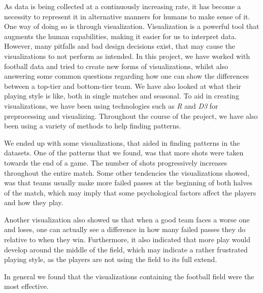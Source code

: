 \documentclass[Report.tex]{subfiles}
\begin{document}
 
As data is being collected at a continuously increasing rate, it has become a necessity to represent it in alternative manners for humans to make sense of it. One way of doing so is through visualization. Visualization is a powerful tool that augments the human capabilities, making it easier for us to interpret data. However, many pitfalls and bad design decisions exist, that may cause the visualizations to not perform as intended. In this project, we have worked with football data and tried to create new forms of visualizations, whilst also answering some common questions regarding how one can show the differences between a top-tier and bottom-tier team. We have also looked at what their playing style is like, both in single matches and seasonal. To aid in creating visualizations, we have been using technologies such as \emph{R} and \emph{D3} for preprocessing and visualizing. Throughout the course of the project, we have also been using a variety of methods to help finding patterns. 

We ended up with some visualizations, that aided in finding patterns in the datasets. One of the patterns that we found, was that more shots were taken towards the end of a game. The number of shots progressively increases throughout the entire match. Some other tendencies the visualizations showed, was that teams usually make more failed passes at the beginning of both halves of the match, which may imply that some psychological factors affect the players and how they play. 

Another visualization also showed us that when a good team faces a worse one and loses, one can actually see a difference in how many failed passes they do relative to when they win. Furthermore, it also indicated that more play would develop around the middle of the field, which may indicate a rather frustrated playing style, as the players are not using the field to its full extend. 

In general we found that the visualizations containing the football field were the most effective. 
\end{document}
